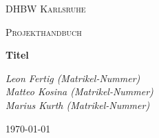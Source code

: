 \documentclass[12pt]{article}
\begin{document}

\begin{titlepage}
	\centering
	{\scshape\LARGE DHBW Karlsruhe\par}
	\vspace{1cm}
	{\scshape\Large Projekthandbuch\par}
	\vspace{1.5cm}
	{\huge\bfseries Titel\par}
	\vspace{2cm}
	{\Large\itshape Leon Fertig (Matrikel-Nummer)\\Matteo Kosina (Matrikel-Nummer)\\Marius Kurth (Matrikel-Nummer)\par}
	\vfill
	\vfill

	{\large \today\par}
\end{titlepage}

\tableofcontents
\thispagestyle{empty}
\newpage

\setcounter{page}{1}
\end{document}
